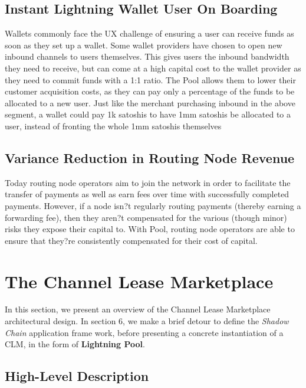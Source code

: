 \documentclass[12pt,a4paper]{article}
\theoremstyle{definition}
\begin{document}
\subsection{Instant Lightning Wallet User On Boarding}

Wallets commonly face the UX challenge of ensuring a user can receive funds as
soon as they set up a wallet. Some wallet providers have chosen to open new
inbound channels to users themselves. This gives users the inbound bandwidth
they need to receive, but can come at a high capital cost to the wallet
provider as they need to commit funds with a 1:1 ratio. The Pool allows them to
lower their customer acquisition costs, as they can pay only a percentage of
the funds to be allocated to a new user. Just like the merchant purchasing
inbound in the above segment, a wallet could pay 1k satoshis to have 1mm
satoshis be allocated to a user, instead of fronting the whole 1mm satoshis
themselves

\subsection{Variance Reduction in Routing Node Revenue}

Today routing node operators aim to join the network in order to facilitate the
transfer of payments as well as earn fees over time with successfully completed
payments. However, if a node isn?t regularly routing payments (thereby earning
a forwarding fee), then they aren?t compensated for the various (though minor)
risks they expose their capital to. With Pool, routing node operators are able
to ensure that they?re consistently compensated for their cost of capital.

\section{The Channel Lease Marketplace} %

In this section, we present an overview of the Channel Lease Marketplace
architectural design. In section 6, we make a brief detour to define the
\emph{Shadow Chain} application frame work, before presenting a concrete
instantiation of a CLM, in the form of \textbf{Lightning Pool}.

\subsection{High-Level Description}
\end{document}
